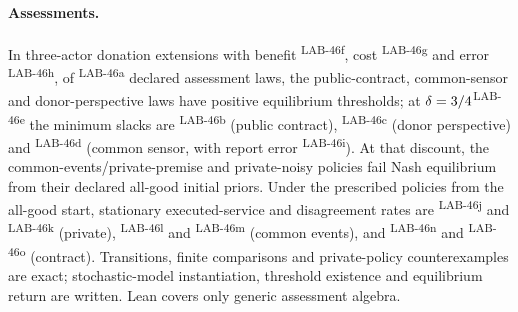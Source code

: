 \documentclass[pdflatex,sn-basic]{sn-jnl}%
\newcommand{\rec}[1]{\ifannotated\textsuperscript{\textcolor{blue!60!black}{\tiny#1}}\fi}
\begin{document}
\begin{appendices}
\paragraph{Assessments.} In three-actor donation extensions with benefit \numDEightBenefit\rec{LAB-46f}, cost \numDEightCost\rec{LAB-46g} and error \numDEightEps\rec{LAB-46h}, of \numDEightLaws\rec{LAB-46a} declared assessment laws, the public-contract, common-sensor and donor-perspective laws have positive equilibrium thresholds; at $\delta=3/4$\rec{LAB-46e} the minimum slacks are \numDEightSlackContract\rec{LAB-46b} (public contract), \numDEightSlackDonor\rec{LAB-46c} (donor perspective) and \numDEightSlackSensor\rec{LAB-46d} (common sensor, with report error \numDEightSensorErr\rec{LAB-46i}). At that discount, the common-events/private-premise and private-noisy policies fail Nash equilibrium from their declared all-good initial priors. Under the prescribed policies from the all-good start, stationary executed-service and disagreement rates are \numDEightPrivateCoop\rec{LAB-46j} and \numDEightPrivateDis\rec{LAB-46k} (private), \numDEightCommonCoop\rec{LAB-46l} and \numDEightCommonDis\rec{LAB-46m} (common events), and \numDEightContractCoop\rec{LAB-46n} and \numDEightContractDis\rec{LAB-46o} (contract). Transitions, finite comparisons and private-policy counterexamples are exact; stochastic-model instantiation, threshold existence and equilibrium return are written. Lean covers only generic assessment algebra.


\end{appendices}
\end{document}
